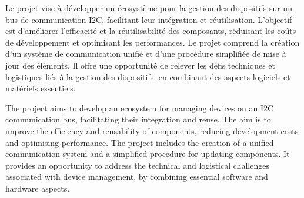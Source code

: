 Le projet vise à développer un écosystème pour la gestion des dispositifs sur un bus de communication I2C, facilitant leur intégration et réutilisation. L'objectif est d'améliorer l'efficacité et la réutilisabilité des composants, réduisant les coûts de développement et optimisant les performances. Le projet comprend la création d'un système de communication unifié et d'une procédure simplifiée de mise à jour des éléments. Il offre une opportunité de relever les défis techniques et logistiques liés à la gestion des dispositifs, en combinant des aspects logiciels et matériels essentiels.

\asterism

The project aims to develop an ecosystem for managing devices on an I2C communication bus, facilitating their integration and reuse. The aim is to improve the efficiency and reusability of components, reducing development costs and optimising performance. The project includes the creation of a unified communication system and a simplified procedure for updating components. It provides an opportunity to address the technical and logistical challenges associated with device management, by combining essential software and hardware aspects.
